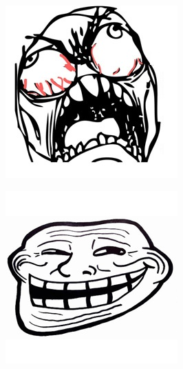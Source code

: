 \begin{multicols}{8}
\begin{center}
\includegraphics[width=\linewidth]{./IMG-GIT/MEMES/meme-face-cabreado.jpg}  
\end{center}

\end{multicols}

\vfill
\pagebreak

\begin{center}
	\includegraphics[height=\textheight]{./IMG-GIT/MEMES/meme-faces-troll.jpg}
\end{center}

\vfill
\pagebreak